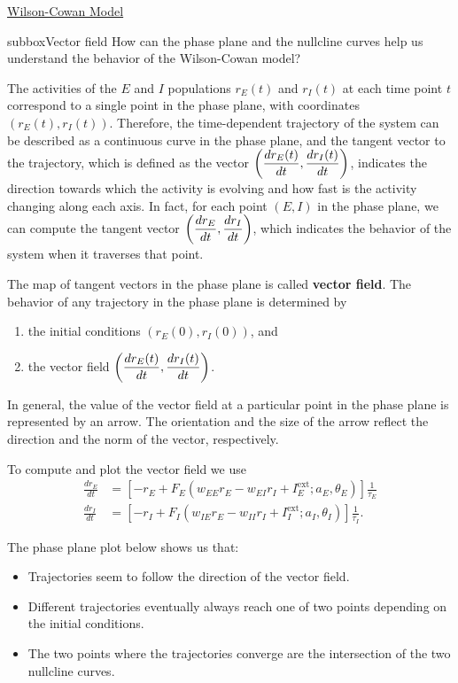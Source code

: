 \begin{textbox}{\href{https://compneuro.neuromatch.io/tutorials/W2D4_DynamicNetworks/chapter_title.html}{Wilson-Cowan Model } }

\begin{subbox}{subbox}{Vector field}
\scriptsize
How can the phase plane and the nullcline curves help us understand the behavior of the Wilson-Cowan model?

The activities of the $E$ and $I$ populations $r_E(t)$ and $r_I(t)$ at each time point $t$ correspond to a single point in the phase plane, with coordinates $(r_E(t),r_I(t))$. Therefore, the time-dependent trajectory of the system can be described as a continuous curve in the phase plane, and the tangent vector to the trajectory, which is defined as the vector $\bigg{(}\displaystyle{\frac{dr_E(t)}{dt},\frac{dr_I(t)}{dt}}\bigg{)}$, indicates the direction towards which the activity is evolving and how fast is the activity changing along each axis. In fact, for each point $(E,I)$ in the phase plane, we can compute the tangent vector $\bigg{(}\displaystyle{\frac{dr_E}{dt},\frac{dr_I}{dt}}\bigg{)}$, which  indicates the behavior of the system when it traverses that point. 

The map of tangent vectors in the phase plane is called \textbf{vector field}. The behavior of any trajectory in the phase plane is determined by \begin{enumerate}
    \item 
the initial conditions $(r_E(0),r_I(0))$, and 
\item the vector field $\bigg{(}\displaystyle{\frac{dr_E(t)}{dt},\frac{dr_I(t)}{dt}}\bigg{)}$.
\end{enumerate} 
In general, the value of the vector field at a particular point in the phase plane is represented by an arrow. The orientation and the size of the arrow reflect the direction and the norm of the vector, respectively.

To compute and plot the vector field we use
\begin{align*}
\frac{dr_E}{dt} &= [-r_E + F_E(w_{EE}r_E -w_{EI}r_I + I^{\text{ext}}_E;a_E,\theta_E)]\frac{1}{\tau_E}\\
\frac{dr_I}{dt} &= [-r_I + F_I(w_{IE}r_E -w_{II}r_I + I^{\text{ext}}_I;a_I,\theta_I)]\frac{1}{\tau_I}.   
\end{align*}

The phase plane plot below shows us that:

\begin{itemize}
    \item 
 Trajectories seem to follow the direction of the vector field.
\item Different trajectories eventually always reach one of two points depending on the initial conditions.
\item The two points where the trajectories converge are the intersection of the two nullcline curves.
\end{itemize}



\end{subbox}
\end{textbox}
